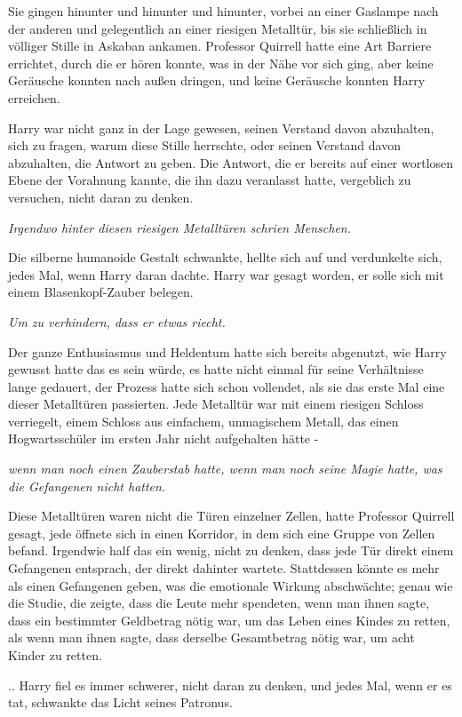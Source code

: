 {Sie gingen hinunter und hinunter und hinunter, vorbei an einer Gaslampe nach der anderen und gelegentlich an einer riesigen Metalltür, bis sie schließlich in völliger Stille in Askaban ankamen. Professor Quirrell hatte eine Art Barriere errichtet, durch die er hören konnte, was in der Nähe vor sich ging, aber keine Geräusche konnten nach außen dringen, und keine Geräusche konnten Harry erreichen.

Harry war nicht ganz in der Lage gewesen, seinen Verstand davon abzuhalten, sich zu fragen, warum diese Stille herrschte, oder seinen Verstand davon abzuhalten, die Antwort zu geben. Die Antwort, die er bereits auf einer wortlosen Ebene der Vorahnung kannte, die ihn dazu veranlasst hatte, vergeblich zu versuchen, nicht daran zu denken.

\emph{Irgendwo hinter diesen riesigen Metalltüren schrien Menschen.}

Die silberne humanoide Gestalt schwankte, hellte sich auf und verdunkelte sich, jedes Mal, wenn Harry daran dachte. Harry war gesagt worden, er solle sich mit einem Blasenkopf-Zauber belegen.

\emph{Um zu verhindern, dass er etwas riecht.}

Der ganze Enthusiasmus und Heldentum hatte sich bereits abgenutzt, wie Harry gewusst hatte das es sein würde, es hatte nicht einmal für seine Verhältnisse lange gedauert, der Prozess hatte sich schon vollendet, als sie das erste Mal eine dieser Metalltüren passierten. Jede Metalltür war mit einem riesigen Schloss verriegelt, einem Schloss aus einfachem, unmagischem Metall, das einen Hogwartsschüler im ersten Jahr nicht aufgehalten hätte -

\emph{wenn man noch einen Zauberstab hatte, wenn man noch seine Magie hatte, was die Gefangenen nicht hatten.}

Diese Metalltüren waren nicht die Türen einzelner Zellen, hatte Professor Quirrell gesagt, jede öffnete sich in einen Korridor, in dem sich eine Gruppe von Zellen befand. Irgendwie half das ein wenig, nicht zu denken, dass jede Tür direkt einem Gefangenen entsprach, der direkt dahinter wartete. Stattdessen könnte es mehr als einen Gefangenen geben, was die emotionale Wirkung abschwächte; genau wie die Studie, die zeigte, dass die Leute mehr spendeten, wenn man ihnen sagte, dass ein bestimmter Geldbetrag nötig war, um das Leben eines Kindes zu retten, als wenn man ihnen sagte, dass derselbe Gesamtbetrag nötig war, um acht Kinder zu retten.

.. Harry fiel es immer schwerer, nicht daran zu denken, und jedes Mal, wenn er es tat, schwankte das Licht seines Patronus.

}
